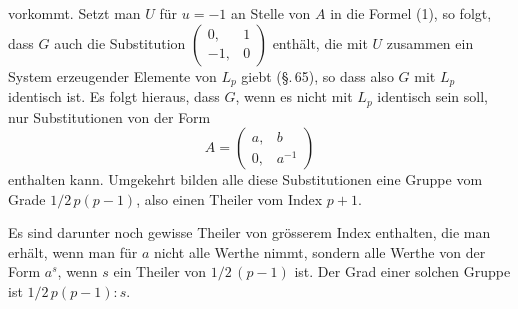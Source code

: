 vorkommt. Setzt man $U$ für $u = -1$ an Stelle von $A$ in die Formel (1), so folgt, dass $G$ auch die Substitution $\begin{pmatrix}0, & 1\\ -1, & 0\end{pmatrix}$ enthält, die mit $U$ zusammen ein System erzeugender Elemente von $L_p$ giebt (\S.\,65), so dass also $G$ mit $L_p$ identisch ist. Es folgt hieraus, dass $G$, wenn es nicht mit $L_p$ identisch sein soll, nur Substitutionen von der Form
\[
A = \begin{pmatrix}a, & b\\ 0, & a^{-1}\end{pmatrix}
\]
enthalten kann. Umgekehrt bilden alle diese Substitutionen eine Gruppe vom Grade $1/2\,p(p-1)$, also einen Theiler vom Index $p+1$.

Es sind darunter noch gewisse Theiler von grösserem Index enthalten, die man erhält, wenn man für $a$ nicht alle Werthe nimmt, sondern alle Werthe von der Form $a^s$, wenn $s$ ein Theiler von $1/2\,(p-1)$ ist. Der Grad einer solchen Gruppe ist $1/2\,p(p-1) : s$.
